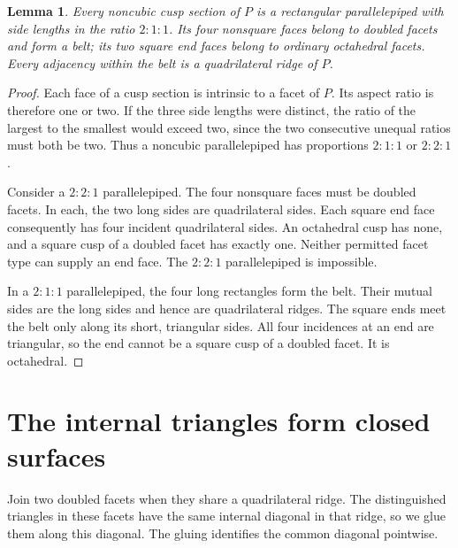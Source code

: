 \documentclass[11pt]{article}
\newtheorem{lemma}[theorem]{Lemma}
\theoremstyle{remark}
\begin{document}
\begin{lemma}\label{lem:box}
Every noncubic cusp section of $P$ is a rectangular parallelepiped
with side lengths in the ratio $2:1:1$.
Its four nonsquare faces belong to doubled facets and form a belt;
its two square end faces belong to ordinary octahedral facets.
Every adjacency within the belt is a quadrilateral ridge of $P$.
\end{lemma}
\begin{proof}
Each face of a cusp section is intrinsic to a facet of $P$.
Its aspect ratio is therefore one or two. If the three side lengths
were distinct, the ratio of the largest to the smallest would exceed
two, since the two consecutive unequal ratios must both be two.
Thus a noncubic parallelepiped has proportions $2:1:1$ or $2:2:1$.

Consider a $2:2:1$ parallelepiped. The four nonsquare faces must be doubled
facets. In each, the two long sides are quadrilateral sides. Each
square end face consequently has four incident quadrilateral sides.
An octahedral cusp has none, and a square cusp of a doubled facet
has exactly one. Neither permitted facet type can supply an end
face. The $2:2:1$ parallelepiped is impossible.

In a $2:1:1$ parallelepiped, the four long rectangles form the belt. Their
mutual sides are the long sides and hence are quadrilateral ridges.
The square ends meet the belt only along its short, triangular
sides. All four incidences at an end are triangular, so the end
cannot be a square cusp of a doubled facet. It is octahedral.
\end{proof}

\section{The internal triangles form closed surfaces}

Join two doubled facets when they share a quadrilateral ridge.
The distinguished triangles in these facets have the same internal
diagonal in that ridge, so we glue them along this diagonal. The
gluing identifies the common diagonal pointwise.
\end{document}
